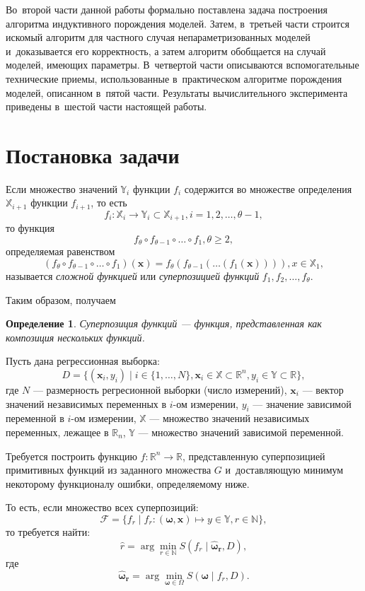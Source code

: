 \documentclass[12pt,a4paper]{amsart}
\newtheorem{defin}{Определение}
\begin{document}
Во~второй части данной работы формально поставлена задача построения алгоритма
индуктивного порождения моделей. Затем, в~третьей части строится искомый
алгоритм для частного случая непараметризованных моделей и~доказывается его
корректность, а затем алгоритм обобщается на случай моделей, имеющих параметры.
В~четвертой части описываются вспомогательные технические приемы, использованные
в~практическом алгоритме порождения моделей, описанном в~пятой части. Результаты
вычислительного эксперимента приведены в~шестой части настоящей работы.

\section{Постановка задачи}

Если множество значений $\mathbb{Y}_i$ функции $f_i$ содержится во множестве
определения $\mathbb{X}_{i+1}$ функции $f_{i+1}$, то есть
\[
f_i : \mathbb{X}_i \to \mathbb{Y}_i \subset \mathbb{X}_{i+1}, i = 1, 2, \dots, \theta - 1,
\]
то функция
\[
f_\theta \circ f_{\theta-1} \circ \dots \circ f_1, \theta \geq 2,
\]
определяемая равенством
\[
(f_\theta \circ f_{\theta-1} \circ \dots \circ f_1) (\mathbf{x}) =
  f_{\theta} (f_{\theta-1} (\dots (f_1 (\mathbf{x})))), x \in \mathbb{X}_1,
\]
называется \emph{сложной функцией}\cite{MathEnc1984_4} или
\emph{суперпозицией функций} $f_1, f_2, \dots, f_\theta$.

Таким образом, получаем
\begin{defin}
  Суперпозиция функций --- функция, представленная как композиция нескольких
  функций. 
\end{defin}

Пусть дана регрессионная выборка:
\[
D = \{ (\mathbf{x}_i, y_i) \mid i \in \{1, \dots, N\},
			\mathbf{x}_i \in \mathbb{X} \subset \mathbb{R}^n,
			y_i \in \mathbb{Y} \subset \mathbb{R} \},
\]
где $N$ --- размерность регресионной выборки (число измерений), $\mathbf{x}_i$
--- вектор значений независимых переменных в $i$-ом измерении, $y_i$ ---
значение зависимой переменной в $i$-ом измерении, $\mathbb{X}$ --- множество
значений независимых переменных, лежащее в $\mathbb{R}_n$, $\mathbb{Y}$ ---
множество значений зависимой переменной.

Требуется построить функцию $f : \mathbb{R}^n \rightarrow \mathbb{R}$,
представленную суперпозицией примитивных функций из заданного множества $G$
и~доставляющую минимум некоторому функционалу ошибки, определяемому ниже.

То есть, если множество всех суперпозиций:
\[
\mathcal{F} = \{ f_r \mid
			f_r : (\boldsymbol{\omega}, \mathbf{x}) \mapsto y \in \mathbb{Y},
			r \in \mathbb{N} \},
\]
то требуется найти:
\begin{equation}
  \label{eq:hat_r}
  \hat{r} = \arg \min_{r \in \mathbb{N}} S (f_r \mid \boldsymbol{\hat{\omega}_r}, D),
\end{equation}
где
\begin{equation}
  \label{eq:hat_omega}
  \boldsymbol{\hat{\omega}_r} = \arg \min_{\boldsymbol{\omega} \in \Omega} S(\boldsymbol{\omega} \mid f_r, D).
\end{equation}
\end{document}
